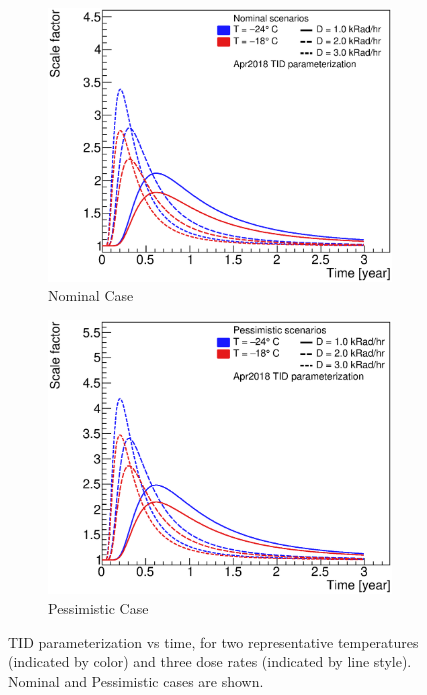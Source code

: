 \begin{figure}[ht!]
\begin{center}
\begin{subfigure}[t]{0.49\textwidth}\includegraphics[width=0.99\linewidth]{figures/AbcTidBumpVersionRatesAndTemps_Nominal}\caption{Nominal Case}\end{subfigure}
\begin{subfigure}[t]{0.49\textwidth}\includegraphics[width=0.99\linewidth]{figures/AbcTidBumpVersionRatesAndTemps_Pessimistic}\caption{Pessimistic Case}\end{subfigure}
\end{center}
\caption{TID parameterization vs time, for two representative temperatures (indicated by
color) and three dose rates (indicated by line style). Nominal and Pessimistic cases are shown.}
\label{tid_parameterization}
\end{figure}

